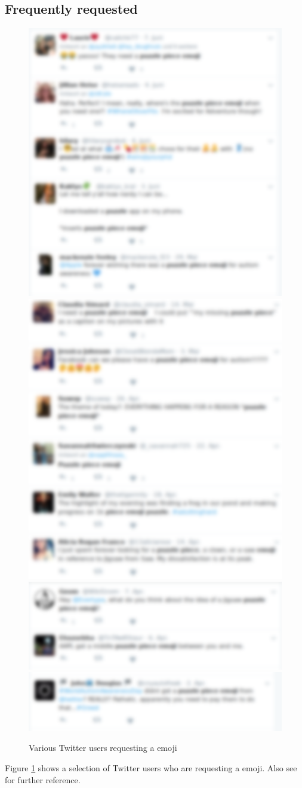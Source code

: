 \documentclass{scrartcl}[10pt,a4paper]
\begin{document}
        \subsection{Frequently requested}
        \begin{figure}[b]
				\includegraphics[width=.5\textwidth]{twitter1.png}
				\includegraphics[width=.5\textwidth]{twitter2.png}
				\includegraphics[width=.5\textwidth]{twitter3.png}
				\includegraphics[width=.5\textwidth]{twitter4.png}
				\caption{Various Twitter users requesting a \textit{\myemojiname} emoji}
				\label{fig:twitter}
        \end{figure}
        
        Figure \ref{fig:twitter} shows a selection of Twitter users who are requesting a \textit{\myemojiname} emoji. Also see \cite{exam} for further reference.
\end{document}
